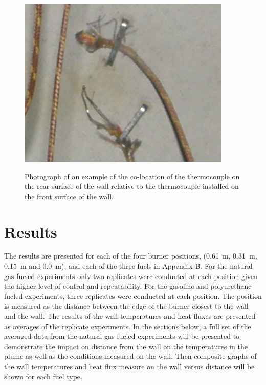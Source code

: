 \documentclass[twoside]{uocthesis}
\begin{document}
{\begin{figure}
	\centering
	\includegraphics[width=4.0in]{../Figures/Instrumented_Wall_Detail_Rear_TC_photo}\\
	\caption[Photograph of an example of the co-location of the thermocouple on the rear surface of the wall relative to the thermocouple installed on the front surface of the wall]{Photograph of an example of the co-location of the thermocouple on the rear surface of the wall relative to the thermocouple installed on the front surface of the wall.}
	\label{Instrumented_Wall_Detail_Rear_TC_photo}
\end{figure}


\section{Results}

The results are presented for each of the four burner positions, (0.61~m, 0.31~m, 0.15~m and 0.0~m), and each of the three fuels in Appendix B.  For the natural gas fueled experiments only two replicates were conducted at each position given the higher level of control and repeatability.  For the gasoline and polyurethane fueled experiments, three replicates were conducted at each position. The position is measured as the distance between the edge of the burner closest to the wall and the wall.  The results of the wall temperatures and heat fluxes are presented as averages of the replicate experiments.  In the sections below, a full set of the averaged data from the natural gas fueled experiments will be presented to demonstrate the impact on distance from the wall on the temperatures in the plume as well as the conditions measured on the wall. Then composite graphs of the wall temperatures and heat flux measure on the wall versus distance will be shown for each fuel type.

}
\end{document}
